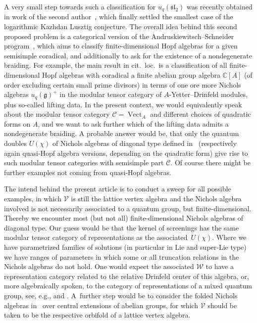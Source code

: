 \documentclass[pdftex]{sigma}%
\numberwithin{equation}{section}
\newcommand{\C}{\mathbb{C}}
\begin{document}
A very small step towards such a classification for $u_q(\mathfrak{sl}_2)$ was recently obtained in work of the second author~\cite{CLR21}, which finally settled the smallest case of the logarithmic Kazhdan Lusztig conjecture. The overall idea behind this second proposed problem is a categorical version of the Andruskiewitsch--Schneider program~\cite{AS10}, which aims to classify finite-dimensional Hopf algebras for a given semisimple coradical, and additionally to ask for the existence of a nondegenerate braiding. For example, the main result in cit.~loc.~is a classification of all finite-dimensional Hopf algebras with coradical a finite abelian group algebra $\C[A]$ (of order excluding certain small prime divisors) in terms of one ore more Nichols algebras $u_q(\mathfrak{g})^+$ in the modular tensor category of $A$-Yetter--Drinfeld modules, plus so-called lifting data. In the present context, we would equivalently speak about the modular tensor category $\mathcal{C}=\operatorname{Vect}_{A}$ and different choices of quadratic forms on $A$, and we want to ask further which of the lifting data admits a nondegenerate braiding. A probable answer would be, that only the quantum doubles $U(\chi)$ of Nichols algebras of diagonal type defined in~\cite{Heck07} (respectively again quasi-Hopf algebra versions, depending on the quadratic form) give rise to such modular tensor categories with semisimple part $\mathcal{C}$. Of course there might be further examples not coming from quasi-Hopf algebras.

The intend behind the present article is to conduct a sweep for all possible examples, in which $\mathcal{V}$ is still the lattice vertex algebra and the Nichols algebra involved is not necessarily associated to a quantum group, but finite-dimensional. Thereby we encounter most (but not all) finite-dimensional Nichols algebras of diagonal type. Our guess would be that the kernel of screenings has the same modular tensor category of representations as the associated~$U(\chi)$. Where we have parametrized families of solutions (in particular in Lie and super-Lie type) we have ranges of parameters in which some or all truncation relations in the Nichols algebras do not hold. One would expect the associated $\mathcal{W}$ to have a representation category related to the relative Drinfeld center of this algebra, or, more algebraically spoken, to the category of representations of a mixed quantum group, see, e.g., \cite{G21, GG17} and \cite{Ang16, L19}. A~further step would be to consider the folded Nichols algebras in~\cite{Len14} over central extensions of abelian groups, for which $\mathcal{V}$ should be taken to be the respective orbifold of a lattice vertex algebra.
\end{document}
